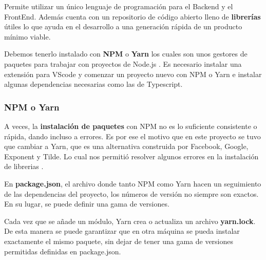 \documentclass[12pt,twoside,titlepage]{report}
\begin{document}
Permite utilizar un único lenguaje de programación para el Backend y el FrontEnd. Además cuenta con un repositorio de código abierto lleno de \textbf{librerías} útiles lo que ayuda en el desarrollo a una generación rápida de un producto mínimo viable.

Debemos tenerlo instalado con \textbf{NPM} o \textbf{Yarn} los cuales son unos gestores de paquetes para trabajar con proyectos de Node.js \cite{npm}. Es necesario instalar una extensión para VScode y comenzar un proyecto nuevo con NPM o Yarn e instalar algunas dependencias necesarias como las de Typescript.

\subsubsection{NPM o Yarn}

A veces, la \textbf{instalación de paquetes} con NPM no es lo suficiente consistente o rápida, dando incluso a errores. Es por ese el motivo que en este proyecto se tuvo que cambiar a Yarn, que es una alternativa construida por Facebook, Google, Exponent y Tilde. Lo cual nos permitió resolver algunos errores en la instalación de librerias \cite{npmyarn}.

En \textbf{package.json}, el archivo donde tanto NPM como Yarn hacen un seguimiento de las dependencias del proyecto, los números de versión no siempre son exactos. En su lugar, se puede definir una gama de versiones.

Cada vez que se añade un módulo, Yarn crea o actualiza un archivo \textbf{yarn.lock}.
De esta manera se puede garantizar que en otra máquina se pueda instalar exactamente el mismo paquete, sin dejar de tener una gama de versiones permitidas definidas en package.json. 
\cite{yarn}
\end{document}

